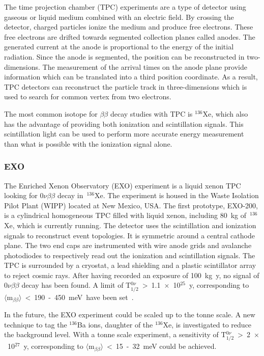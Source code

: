 \documentclass[main.tex]{subfiles}
\begin{document}
\NI The time projection chamber (TPC) experiments are a type of detector using gaseous or liquid medium combined with an electric field. By crossing the detector, charged particles ionize the medium and produce free electrons. These free electrons are drifted towards segmented collection planes called anodes. The generated current at the anode is proportional to the energy of the initial radiation. Since the anode is segmented, the position can be reconstructed in two-dimensions. The measurement of the arrival times on the anode plane provide information which can be translated into a third position coordinate. As a result, TPC detectors can reconstruct the particle track in three-dimensions which is used to search for common vertex from two electrons.


\bigskip


\NI The most common isotope for $\beta\beta$ decay studies with TPC is $^{\text{136}}$Xe, which also has the advantage of providing both ionization and scintillation signals. This scintillation light can be used to perform more accurate energy measurement than what is possible with the ionization signal alone.    


\subsubsection{EXO}


\NI The Enriched Xenon Observatory (EXO) experiment is a liquid xenon TPC looking for 0$\nu\beta\beta$ decay in~$^{\text{136}}$Xe. The experiment is housed in the Waste Isolation Pilot Plant (WIPP) located at New Mexico, USA. The first prototype, EXO-200, is a cylindrical homogeneous TPC filled with liquid xenon, including 80~kg of~$^{\text{136}}$Xe, which is currently running. The detector uses the scintillation and ionization signals to reconstruct event topologies. It is symmetric around a central cathode plane. The two end caps are instrumented with wire anode grids and avalanche photodiodes to respectively read out the ionization and scintillation signals. The TPC is surrounded by a cryostat, a lead shielding and a plastic scintillator array to reject cosmic rays. After having recorded an exposure of 100~kg~y, no signal of 0$\nu\beta\beta$ decay has been found. A limit of T$_{\text{1/2}}^{0\nu}$~>~1.1~$\times$~10$^{\text{25}}$~y, corresponding to $\langle \text{m}_{\beta\beta} \rangle$~<~190~-~450~meV~have been set~\cite{EXO-200}. 


\bigskip


\NI In the future, the EXO experiment could be scaled up to the tonne scale. A new technique to tag the $^{\text{136}}$Ba ions, daughter of the $^{\text{136}}$Xe, is investigated to reduce the background level. With a tonne scale experiment, a sensitivity of T$_{\text{1/2}}^{0\nu}$~>~2~$\times$~10$^{\text{27}}$~y, corresponding to $\langle \text{m}_{\beta\beta} \rangle$~<~15~-~32~meV could be achieved.
\end{document}
